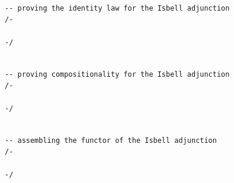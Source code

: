 \documentclass{book}
\theoremstyle{definition}
\newcounter{lcounter}
\begin{document}
{{%
\begin{center}
\begin{tcolorbox}[width=5in,colback={white},title={\begin{center}\texttt{Lean \thelcounter} \addtocounter{lcounter}{1}  \end{center}},colbacktitle=Blue,coltitle=black]
\begin{verbatim}

-- proving the identity law for the Isbell adjunction
/-

-/

\end{verbatim}
\end{tcolorbox}
\end{center}


\begin{center}
\begin{tcolorbox}[width=5in,colback={white},title={\begin{center}\texttt{Lean \thelcounter} \addtocounter{lcounter}{1}  \end{center}},colbacktitle=Blue,coltitle=black]
\begin{verbatim}

-- proving compositionality for the Isbell adjunction
/-

-/

\end{verbatim}
\end{tcolorbox}
\end{center}


\begin{center}
\begin{tcolorbox}[width=5in,colback={white},title={\begin{center}\texttt{Lean \thelcounter} \addtocounter{lcounter}{1}  \end{center}},colbacktitle=Blue,coltitle=black]
\begin{verbatim}

-- assembling the functor of the Isbell adjunction
/-

-/

\end{verbatim}
\end{tcolorbox}
\end{center}

}}
\end{document}
